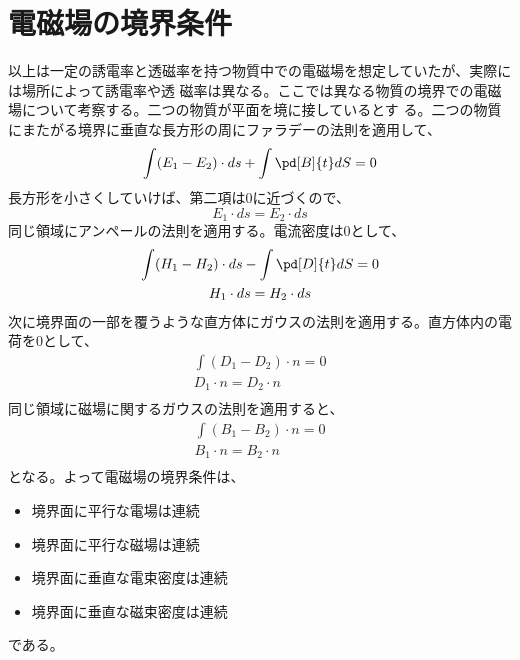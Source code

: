     \section{電磁場の境界条件}
        以上は一定の誘電率と透磁率を持つ物質中での電磁場を想定していたが、実際には場所によって誘電率や透
        磁率は異なる。ここでは異なる物質の境界での電磁場について考察する。二つの物質が平面を境に接しているとす
        る。二つの物質にまたがる境界に垂直な長方形の周にファラデーの法則を適用して、
            \[\int(E_1 - E_2)\cdot ds + \int\pd[B]{t}dS = 0\]
        長方形を小さくしていけば、第二項は0に近づくので、
            \[E_1\cdot ds = E_2\cdot ds\]
        同じ領域にアンペールの法則を適用する。電流密度は0として、
        \begin{gather*}
            \int(H_1 - H_2)\cdot ds - \int\pd[D]{t}dS = 0\\
            H_1\cdot ds = H_2\cdot ds\\
        \end{gather*}
        次に境界面の一部を覆うような直方体にガウスの法則を適用する。直方体内の電荷を0として、
        \begin{gather*}
            \int(D_1 - D_2)\cdot n = 0\\
            D_1\cdot n = D_2\cdot n\\
        \end{gather*}
        同じ領域に磁場に関するガウスの法則を適用すると、
        \begin{gather*}
            \int(B_1 - B_2)\cdot n = 0\\
            B_1\cdot n = B_2\cdot n\\
        \end{gather*}
        となる。よって電磁場の境界条件は、
        \begin{itemize}
            \item 境界面に平行な電場は連続
            \item 境界面に平行な磁場は連続
            \item 境界面に垂直な電束密度は連続
            \item 境界面に垂直な磁束密度は連続
        \end{itemize}
        である。
